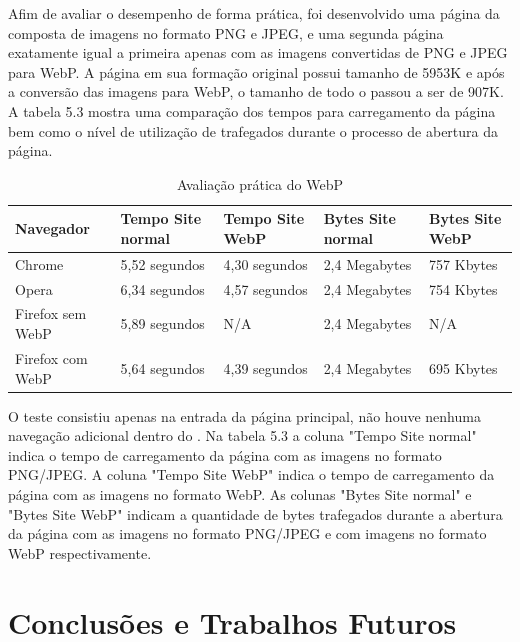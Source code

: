 \documentclass[espaco=simples,appendix=Name]{abnt}
\begin{document}
Afim de avaliar o desempenho de forma prática, foi desenvolvido uma página da  composta de imagens no formato PNG e JPEG, e uma segunda página exatamente igual a primeira apenas com as imagens convertidas de PNG e JPEG para WebP. A página em sua formação original possui tamanho de 5953K e após a conversão das imagens para WebP, o tamanho de todo o  passou a ser de 907K. A tabela 5.3 mostra uma comparação dos tempos para carregamento da página bem como o nível de utilização de  trafegados durante o processo de abertura da página.

\begin{table}[ht]
        \centering
        \caption{Avaliação prática do WebP
        \label{tbl:padc}}{
                \begin{tabular}{|l|p{3cm}|p{3cm}|l|p{2cm}|}
                \hline
                        \textbf{Navegador} & \textbf{Tempo Site normal} & \textbf{Tempo Site WebP} & \textbf{Bytes Site normal} & \textbf{Bytes Site WebP} \\
                        \hline
                        Chrome			&  5,52 segundos	& 4,30 segundos		& 2,4 Megabytes		& 757 Kbytes \\
                        \hline
			Opera			&  6,34 segundos	& 4,57 segundos		& 2,4 Megabytes		& 754 Kbytes \\
			\hline
                        Firefox sem WebP	&  5,89 segundos	& N/A			& 2,4 Megabytes		& N/A \\
                        \hline
                        Firefox com WebP	&  5,64 segundos	& 4,39 segundos		& 2,4 Megabytes		& 695 Kbytes \\
                        \hline
                \end{tabular}
                }
\end{table}

O teste consistiu apenas na entrada da página principal, não houve nenhuma navegação adicional dentro do . Na tabela 5.3 a coluna "Tempo Site normal" indica o tempo de carregamento da página com as imagens no formato PNG/JPEG. A coluna "Tempo Site WebP" indica o tempo de carregamento da página com as imagens no formato WebP. As colunas "Bytes Site normal" e "Bytes Site WebP" indicam a quantidade de bytes trafegados durante a abertura da página com as imagens no formato PNG/JPEG e com imagens no formato WebP respectivamente.

\chapter{Conclusões e Trabalhos Futuros}
\end{document}
